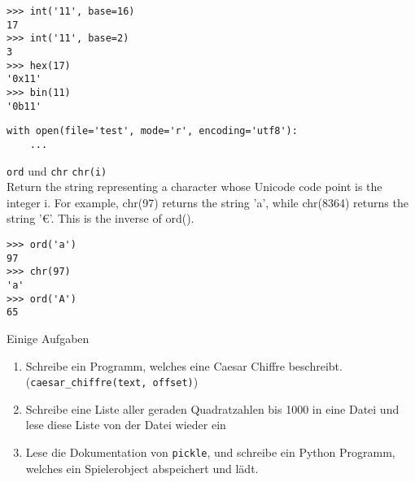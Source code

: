 \begin{frame}[fragile]
\begin{lstlisting}
>>> int('11', base=16)
17
>>> int('11', base=2)
3
>>> hex(17)
'0x11'
>>> bin(11)
'0b11'
\end{lstlisting}

\begin{lstlisting}
with open(file='test', mode='r', encoding='utf8'):
	...
\end{lstlisting}
\end{frame}

\begin{frame}[fragile]{\texttt{ord} und \texttt{chr}}
\texttt{chr(i)}\\
Return the string representing a character whose Unicode code point is the integer i. For example, chr(97) returns the string 'a', while chr(8364) returns the string '€'. This is the inverse of ord().
\begin{lstlisting}
>>> ord('a')
97
>>> chr(97)
'a'
>>> ord('A')
65
\end{lstlisting}
\end{frame}

\begin{frame}{Einige Aufgaben}
\begin{enumerate}
	\item Schreibe ein Programm, welches eine Caesar Chiffre beschreibt. (\texttt{caesar\_chiffre(text, offset)})
	\item Schreibe eine Liste aller geraden Quadratzahlen bis 1000 in eine Datei und lese diese Liste von der Datei wieder ein
	\item Lese die Dokumentation von \texttt{pickle}, und schreibe ein Python Programm, welches ein Spielerobject abspeichert und lädt. 
\end{enumerate}
\end{frame}


